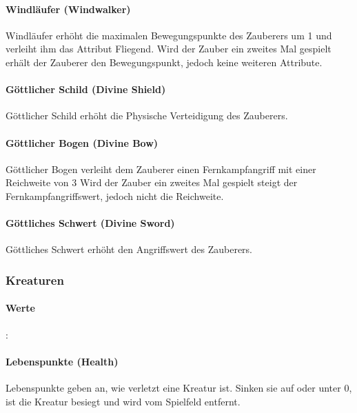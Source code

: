 \documentclass[a4paper,12pt]{scrartcl}
\begin{document}
	\paragraph{Windläufer (\glqq Windwalker\grqq\hspace{0.05em})}
	Windläufer erhöht die maximalen Bewegungspunkte des Zauberers um 1 und verleiht ihm das Attribut Fliegend. Wird der Zauber ein zweites Mal gespielt erhält der Zauberer den Bewegungspunkt, jedoch keine weiteren Attribute.
	
	\paragraph{Göttlicher Schild (\glqq Divine Shield\grqq\hspace{0.05em})}
	Göttlicher Schild erhöht die Physische Verteidigung des Zauberers.
	
	\paragraph{Göttlicher Bogen (\glqq Divine Bow\grqq\hspace{0.05em})}
	Göttlicher Bogen verleiht dem Zauberer einen Fernkampfangriff mit einer Reichweite von 3 Wird der Zauber ein zweites Mal gespielt steigt der Fernkampfangriffswert, jedoch nicht die Reichweite.
	
	\paragraph{Göttliches Schwert (\glqq Divine Sword\grqq\hspace{0.05em})}
	Göttliches Schwert erhöht den Angriffswert des Zauberers.
	
	\subsubsection{Kreaturen}
	\paragraph{Werte}:\newline
	\paragraph{Lebenspunkte (\glqq Health\grqq\hspace{0.05em})}
	Lebenspunkte geben an, wie verletzt eine Kreatur ist. Sinken sie auf oder unter 0, ist die Kreatur besiegt und wird vom Spielfeld entfernt.
	
\end{document}
